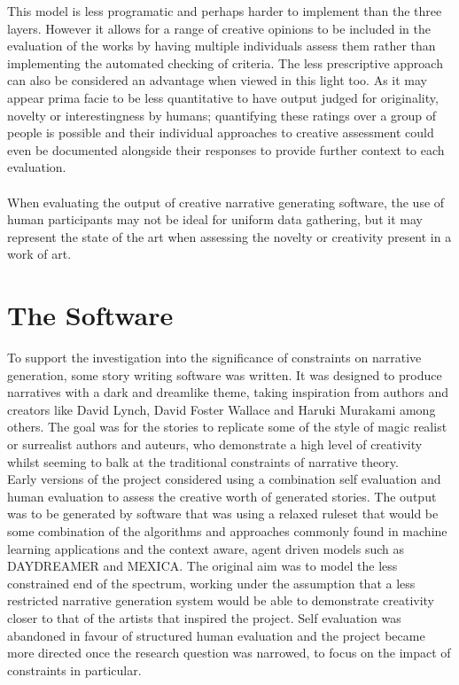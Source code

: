 \documentclass[letterpaper]{article}
\begin{document}
This model is less programatic and perhaps harder to implement than the three layers. However it allows for a range of creative opinions to be included in the evaluation of the works by having multiple individuals assess them rather than implementing the automated checking of criteria. The less prescriptive approach can also be considered an advantage when viewed in this light too. As it may appear prima facie to be less quantitative to have output judged for originality, novelty or interestingness by humans; quantifying these ratings over a group of people is possible and their individual approaches to creative assessment could even be documented alongside their responses to provide further context to each evaluation.\\
\\When evaluating the output of creative narrative generating software, the use of human participants may not be ideal for uniform data gathering,  but it may represent the state of the art when assessing the novelty or creativity present in a work of art.\\

\section{The Software}
To support the investigation into the significance of constraints on narrative generation, some story writing software was written. 
It was designed to produce narratives with a dark and dreamlike theme, taking inspiration from authors and creators like David Lynch, David Foster Wallace and Haruki Murakami among others. The goal was for the stories to replicate some of the style of magic realist or surrealist authors and auteurs, who demonstrate a high level of creativity whilst seeming to balk at the traditional constraints of narrative theory. \\

Early versions of the project considered using a combination self evaluation and human evaluation to assess the creative worth of generated stories. The output was to be generated by software that was using a relaxed ruleset that would be some combination of the algorithms and approaches commonly found in machine learning applications and the context aware, agent driven models such as DAYDREAMER and MEXICA. The original aim was to model the less constrained end of the spectrum, working under the assumption that a less restricted narrative generation system would be able to demonstrate creativity closer to that of the artists that inspired the project. Self evaluation was abandoned in favour of structured human evaluation and the project became more directed once the research question was narrowed, to focus on the impact of constraints in particular.\\
\end{document}
